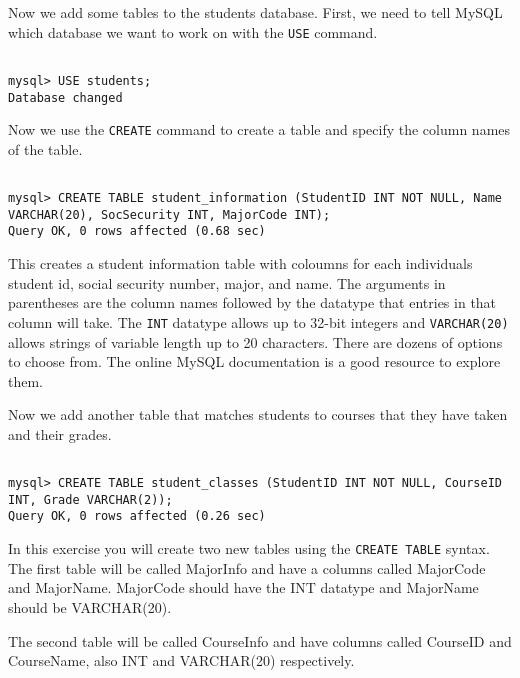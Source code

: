 {Now we add some tables to the students database.  First, we need to tell MySQL which database we want to work on with the {\tt USE} command.

\begin{lstlisting}

mysql> USE students;
Database changed

\end{lstlisting}

Now we use the {\tt CREATE} command to create a table and specify the column names of the table.

\begin{lstlisting}

mysql> CREATE TABLE student_information (StudentID INT NOT NULL, Name VARCHAR(20), SocSecurity INT, MajorCode INT);
Query OK, 0 rows affected (0.68 sec)

\end{lstlisting}

This creates a student information table with coloumns for each individuals student id, social security number, major, and name.  The arguments in parentheses are the column names followed by the datatype that entries in that column will take.  The {\tt INT} datatype allows up to 32-bit integers and {\tt VARCHAR(20)} allows strings of variable length up to 20 characters.  There are dozens of options to choose from.  The online MySQL documentation is a good resource to explore them.

Now we add another table that matches students to courses that they have taken and their grades.

\begin{lstlisting}

mysql> CREATE TABLE student_classes (StudentID INT NOT NULL, CourseID INT, Grade VARCHAR(2));
Query OK, 0 rows affected (0.26 sec)

\end{lstlisting}

\begin{exercise}

In this exercise you will create two new tables using the {\tt CREATE TABLE} syntax.  The first table will be called MajorInfo and have a columns called MajorCode and MajorName.  MajorCode should have the INT datatype and MajorName should be VARCHAR(20).

The second table will be called CourseInfo and have columns called CourseID and CourseName, also INT and VARCHAR(20) respectively.

\end{exercise}

}
